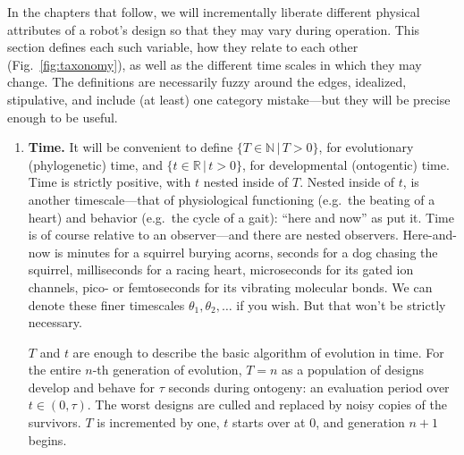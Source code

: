 \noindent
In the chapters that follow, we will incrementally liberate different physical attributes of a robot's design so that they may vary during operation.
This section 
defines each such variable, 
how they relate to each other (Fig.~\ref{fig:taxonomy}), 
as well as the different time scales in which they may change.
The definitions are necessarily fuzzy around the edges, idealized, stipulative, and include (at least) one category mistake---but they will be precise enough to be useful.


\begin{enumerate}

    \item \textbf{Time.} It will be convenient to define $\{T\in\mathbb{N} \,|\, T>0\}$, for evolutionary (phylogenetic) time, and $\{t\in\mathbb{R} \,|\, t>0\}$, for developmental (ontogentic) time.
    Time is strictly positive, with $t$ nested inside of $T$.
    Nested inside of $t$, is another timescale---that of physiological functioning (e.g.~the beating of a heart) and behavior (e.g.~the cycle of a gait):
    ``here and now'' as \citet{pfeifer2006body} put it.
    Time is of course relative to an observer---and there are nested observers.
    Here-and-now is minutes for a squirrel burying acorns, seconds for a dog chasing the squirrel, milliseconds for a racing heart, microseconds for its gated ion channels, pico- or femtoseconds for its vibrating molecular bonds.
    We can denote these finer timescales $\theta_1, \theta_2, \ldots$
    if you wish.
    But that won't be strictly necessary.
    
    $T$ and $t$ are enough to describe the basic algorithm of evolution in time.
    For the entire $n$-th generation of evolution, $T=n$ as a population of designs develop and behave for $\tau$ seconds during ontogeny: an evaluation period over $t\in(0, \tau)$.
    The worst designs are culled and replaced by noisy copies of the survivors.
    $T$ is incremented by one, $t$ starts over at 0, and generation $n+1$ begins.
    
    

\end{enumerate}

